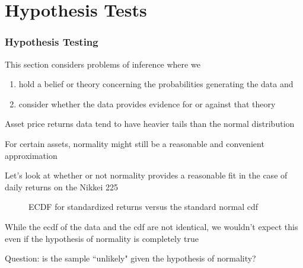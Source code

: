 \section{Hypothesis Tests}

\begin{frame}\frametitle{Hypothesis Testing}
    
    \vspace{2em}
    This section considers problems of inference where we
    \begin{enumerate}
        \item hold a belief or theory concerning the probabilities generating the
            data and
        \item consider whether the data provides evidence for or against that theory
    \end{enumerate}
    
\end{frame}

\begin{frame}

    \vspace{2em}
    \Eg
    Asset price returns data tend to have heavier tails than the
    normal distribution
    
    For certain assets, normality might still be a
    reasonable and convenient approximation
    
    Let's look at whether or not normality provides a reasonable fit in the
    case of daily returns on the Nikkei 225
\end{frame}

\begin{frame}

    \begin{figure}
    \centering
    \caption{\label{f:nikkei_ecdf} {\sc ECDF} for standardized returns versus the
    standard normal {\sc cdf}}
    \end{figure}

\end{frame}

\begin{frame}
    
    \vspace{2em}
    While the
     {\sc ecdf} of the data and the {\sc cdf} are not identical, we wouldn't
     expect this even if the hypothesis of normality is completely true
     
     \vspace{.7em}
     Question: is the sample ``unlikely" given the
     hypothesis of normality?  

\end{frame}

